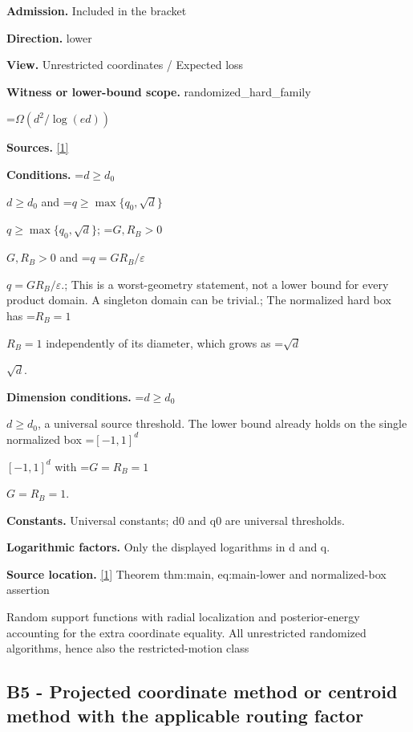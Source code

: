 \documentclass[10pt,a4paper]{article}
\newcommand{\AtlasMath}[1]{\par\begingroup\centering\setbox0=\hbox{$\displaystyle #1$}\ifdim\wd0>1.4\linewidth\typeout{ATLAS WIDE FORMULA: \the\wd0}\fi\ifdim\wd0>\linewidth\resizebox{\linewidth}{!}{\box0}\else\box0\fi\par\endgroup}
\newcommand{\AtlasInlineMath}[1]{\begingroup\setbox0=\hbox{$#1$}\ifdim\wd0>.4\linewidth\endgroup\AtlasMath{#1}\else\endgroup$#1$\fi}
\begin{document}
\textbf{Admission.} Included in the bracket



\textbf{Direction.} lower



\textbf{View.} Unrestricted coordinates / Expected loss



\textbf{Witness or lower-bound scope.} randomized\_hard\_family



\AtlasMath{\Omega(d^2/\log(ed))}


\textbf{Sources.} \href{https://github.com/WU-Wendao/Colombo/blob/main/colombo_sensorium/Complexity_altas/data/sources/colombo/U03/manuscript.pdf}{[1]}



\textbf{Conditions.} \AtlasInlineMath{d\ge d_0} and \AtlasInlineMath{q\ge\max\{q_0,\sqrt d\}}; \AtlasInlineMath{G,R_B>0} and \AtlasInlineMath{q=GR_B/\varepsilon}.; This is a worst-geometry statement, not a lower bound for every product domain. A singleton domain can be trivial.; The normalized hard box has \AtlasInlineMath{R_B=1} independently of its diameter, which grows as \AtlasInlineMath{\sqrt d}.



\textbf{Dimension conditions.} \AtlasInlineMath{d\ge d_0}, a universal source threshold. The lower bound already holds on the single normalized box \AtlasInlineMath{[-1,1]^d} with \AtlasInlineMath{G=R_B=1}.



\textbf{Constants.} Universal constants; d0 and q0 are universal thresholds.



\textbf{Logarithmic factors.} Only the displayed logarithms in d and q.



\textbf{Source location.} \href{https://github.com/WU-Wendao/Colombo/blob/main/colombo_sensorium/Complexity_altas/data/sources/colombo/U03/manuscript.pdf}{[1]} Theorem thm:main, eq:main-lower and normalized-box assertion



Random support functions with radial localization and posterior-energy accounting for the extra coordinate equality. All unrestricted randomized algorithms, hence also the restricted-motion class



\subsection{B5 - Projected coordinate method or centroid method with the applicable routing factor}
\end{document}
